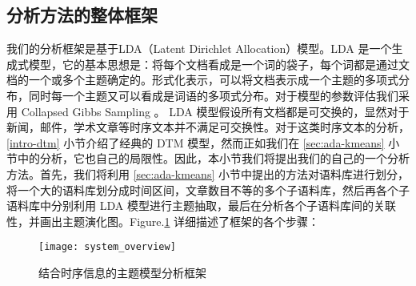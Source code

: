 \subsection{分析方法的整体框架}
\label{sec:framework}
我们的分析框架是基于LDA（Latent Dirichlet Allocation）\cite{Blei:2003}模型。LDA 是一个生成式模型，它的基本思想是：将每个文档看成是一个词的袋子，每个词都是通过文档的一个或多个主题确定的。形式化表示，可以将文档表示成一个主题的多项式分布，同时每一个主题又可以看成是词语的多项式分布。对于模型的参数评估我们采用 Collapsed Gibbs Sampling \cite{griffiths2004finding, heinrich2005parameter}。 LDA 模型假设所有文档都是可交换的，显然对于新闻，邮件，学术文章等时序文本并不满足可交换性。对于这类时序文本的分析，\ref{intro-dtm} 小节介绍了经典的 DTM 模型，然而正如我们在 \ref{sec:ada-kmeans} 小节中的分析，它也自己的局限性。因此，本小节我们将提出我们的自己的一个分析方法。首先，我们将利用 \ref{sec:ada-kmeans} 小节中提出的方法对语料库进行划分，将一个大的语料库划分成时间区间，文章数目不等的多个子语料库，然后再各个子语料库中分别利用 LDA 模型进行主题抽取，最后在分析各个子语料库间的关联性，并画出主题演化图。Figure.\ref{system-overview} 详细描述了框架的各个步骤：
\begin{figure}[htb]
	\texttt{[image: system\_overview]}
	\caption{结合时序信息的主题模型分析框架}
	\label{system-overview}
\end{figure}
